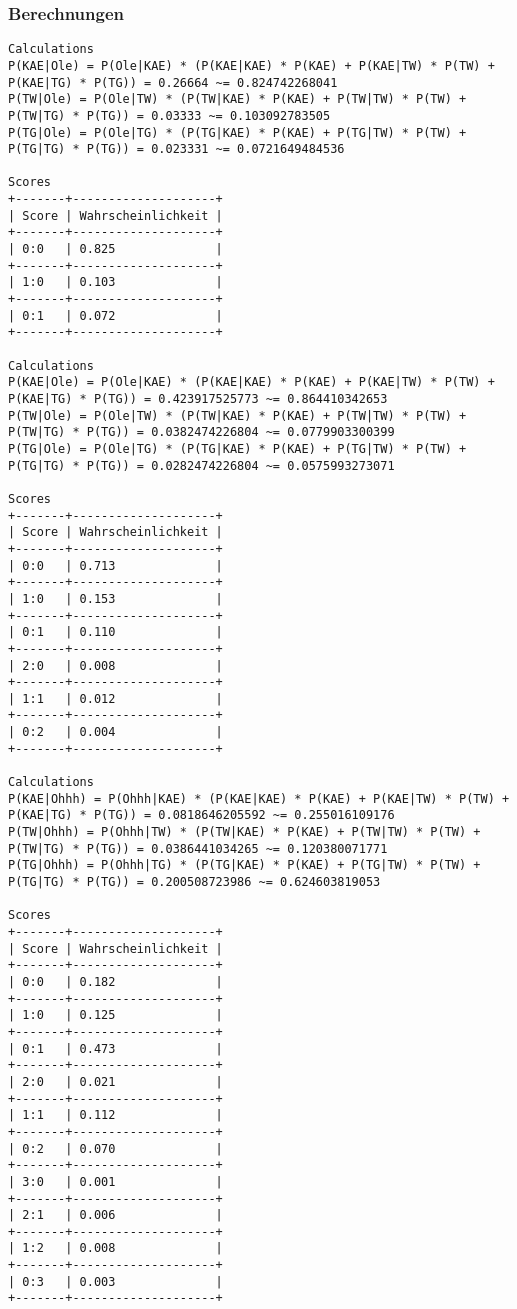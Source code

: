 \documentclass[a4paper]{article}
\begin{document}
\subsubsection{Berechnungen}
\begin{lstlisting}
Calculations
P(KAE|Ole) = P(Ole|KAE) * (P(KAE|KAE) * P(KAE) + P(KAE|TW) * P(TW) + P(KAE|TG) * P(TG)) = 0.26664 ~= 0.824742268041
P(TW|Ole) = P(Ole|TW) * (P(TW|KAE) * P(KAE) + P(TW|TW) * P(TW) + P(TW|TG) * P(TG)) = 0.03333 ~= 0.103092783505
P(TG|Ole) = P(Ole|TG) * (P(TG|KAE) * P(KAE) + P(TG|TW) * P(TW) + P(TG|TG) * P(TG)) = 0.023331 ~= 0.0721649484536

Scores
+-------+--------------------+
| Score | Wahrscheinlichkeit |
+-------+--------------------+
| 0:0   | 0.825              |
+-------+--------------------+
| 1:0   | 0.103              |
+-------+--------------------+
| 0:1   | 0.072              |
+-------+--------------------+

Calculations
P(KAE|Ole) = P(Ole|KAE) * (P(KAE|KAE) * P(KAE) + P(KAE|TW) * P(TW) + P(KAE|TG) * P(TG)) = 0.423917525773 ~= 0.864410342653
P(TW|Ole) = P(Ole|TW) * (P(TW|KAE) * P(KAE) + P(TW|TW) * P(TW) + P(TW|TG) * P(TG)) = 0.0382474226804 ~= 0.0779903300399
P(TG|Ole) = P(Ole|TG) * (P(TG|KAE) * P(KAE) + P(TG|TW) * P(TW) + P(TG|TG) * P(TG)) = 0.0282474226804 ~= 0.0575993273071

Scores
+-------+--------------------+
| Score | Wahrscheinlichkeit |
+-------+--------------------+
| 0:0   | 0.713              |
+-------+--------------------+
| 1:0   | 0.153              |
+-------+--------------------+
| 0:1   | 0.110              |
+-------+--------------------+
| 2:0   | 0.008              |
+-------+--------------------+
| 1:1   | 0.012              |
+-------+--------------------+
| 0:2   | 0.004              |
+-------+--------------------+

Calculations
P(KAE|Ohhh) = P(Ohhh|KAE) * (P(KAE|KAE) * P(KAE) + P(KAE|TW) * P(TW) + P(KAE|TG) * P(TG)) = 0.0818646205592 ~= 0.255016109176
P(TW|Ohhh) = P(Ohhh|TW) * (P(TW|KAE) * P(KAE) + P(TW|TW) * P(TW) + P(TW|TG) * P(TG)) = 0.0386441034265 ~= 0.120380071771
P(TG|Ohhh) = P(Ohhh|TG) * (P(TG|KAE) * P(KAE) + P(TG|TW) * P(TW) + P(TG|TG) * P(TG)) = 0.200508723986 ~= 0.624603819053

Scores
+-------+--------------------+
| Score | Wahrscheinlichkeit |
+-------+--------------------+
| 0:0   | 0.182              |
+-------+--------------------+
| 1:0   | 0.125              |
+-------+--------------------+
| 0:1   | 0.473              |
+-------+--------------------+
| 2:0   | 0.021              |
+-------+--------------------+
| 1:1   | 0.112              |
+-------+--------------------+
| 0:2   | 0.070              |
+-------+--------------------+
| 3:0   | 0.001              |
+-------+--------------------+
| 2:1   | 0.006              |
+-------+--------------------+
| 1:2   | 0.008              |
+-------+--------------------+
| 0:3   | 0.003              |
+-------+--------------------+


\end{lstlisting}
\end{document}
